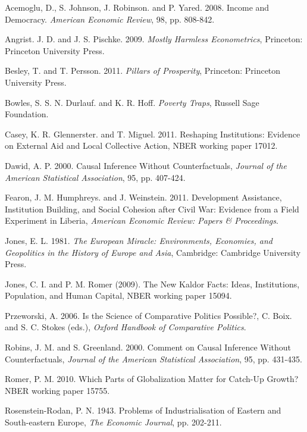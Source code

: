 \documentclass[12pt]{article}%
\begin{document}
\clearpage
\begin{thebibliography}{9} %

\singlespacing

 Acemoglu, D., S. Johnson, J. Robinson. and P. Yared. 2008. Income and Democracy. \textit{American Economic Review}, 98, pp. 808-842. 


 Angrist. J. D. and J. S. Pischke. 2009. \textit{Mostly Harmless Econometrics}, Princeton: Princeton University Press.

 Besley, T. and T. Persson. 2011. \textit{Pillars of Prosperity},  Princeton: Princeton University Press. 

 Bowles, S. S. N. Durlauf. and K. R. Hoff. \textit{Poverty Traps}, Russell Sage Foundation. 


 Casey, K. R. Glennerster. and T. Miguel. 2011. Reshaping Institutions: Evidence 
on External Aid and Local Collective Action, NBER working paper 17012. 

 Dawid, A. P. 2000. Causal Inference Without Counterfactuals, \textit{Journal of the American Statistical Association}, 95, pp. 407-424.

 Fearon, J. M. Humphreys. and J. Weinstein. 2011. Development 
Assistance, Institution Building, and Social Cohesion after Civil War: Evidence from a 
Field Experiment in Liberia, \textit{American Economic Review: Papers \& Proceedings}.

 Jones, E. L. 1981. \textit{The European Miracle: Environments, Economies, and Geopolitics in the 
History of Europe and Asia}, Cambridge: Cambridge University Press.


 Jones, C. I. and P. M. Romer (2009). The New Kaldor Facts: Ideas, Institutions, Population, and Human Capital, NBER working paper 15094. 



 Przeworski, A. 2006. Is the Science of Comparative Politics Possible?, C. Boix. and S. C. Stokes (eds.), \textit{Oxford Handbook of Comparative Politics}.

 Robins, J. M. and S. Greenland. 2000. Comment on Causal Inference Without Counterfactuals, \textit{Journal of the American Statistical Association}, 95, pp. 431-435.

 Romer, P. M. 2010. Which Parts of Globalization Matter for Catch-Up Growth?  NBER working paper 15755. 

 Rosenstein-Rodan, P. N. 1943. Problems of Industrialisation of  Eastern and South-eastern Europe, \textit{The Economic Journal}, pp. 202-211. 



\end{thebibliography}
\end{document}
